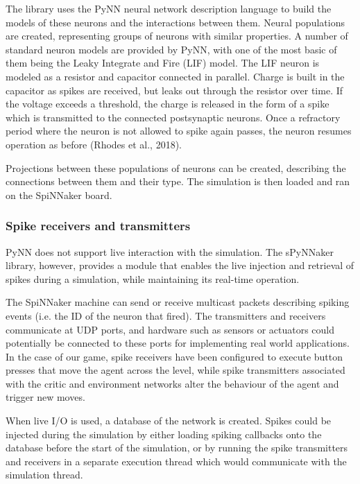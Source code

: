 \documentclass[10pt]{article}
\begin{document}
    The library uses the PyNN neural network description language to build the models of these neurons and the interactions between them. Neural populations are created, representing groups of neurons with similar properties. A number of standard neuron models are provided by PyNN, with one of the most basic of them being the Leaky Integrate and Fire (LIF) model. The LIF neuron is modeled as a resistor and capacitor connected in parallel. Charge is built in the capacitor as spikes are received, but leaks out through the resistor over time. If the voltage exceeds a threshold, the charge is released in the form of a spike which is transmitted to the connected postsynaptic neurons. Once a refractory period where the neuron is not allowed to spike again passes, the neuron resumes operation as before (Rhodes et al., 2018). 
    
    Projections between these populations of neurons can be created, describing the connections between them and their type. The simulation is then loaded and ran on the SpiNNaker board.

    \subsubsection{Spike receivers and transmitters}

    PyNN does not support live interaction with the simulation. The sPyNNaker library, however, provides a module that enables the live injection and retrieval of spikes during a simulation, while maintaining its real-time operation.

    The SpiNNaker machine can send or receive multicast packets describing spiking events (i.e. the ID of the neuron that fired). The transmitters and receivers communicate at UDP ports, and hardware such as sensors or actuators could potentially be connected to these ports for implementing real world applications. In the case of our game, spike receivers have been configured to execute button presses that move the agent across the level, while spike transmitters associated with the critic and environment networks alter the behaviour of the agent and trigger new moves.

    When live I/O is used, a database of the network is created. Spikes could be injected during the simulation by either loading spiking callbacks onto the database before the start of the simulation, or by running the spike transmitters and receivers in a separate execution thread which would communicate with the simulation thread.
\end{document}
